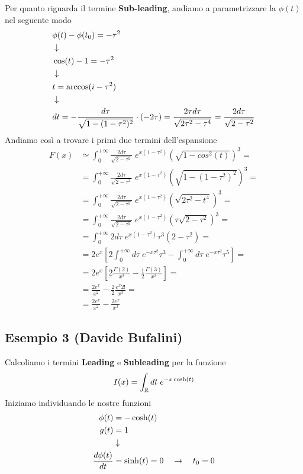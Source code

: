 Per quanto riguarda il termine \textbf{Sub-leading}, andiamo a parametrizzare la $\phi(t)$ nel seguente modo
\begin{align}
	&\phi(t) - \phi(t_0) = -\tau^2 \\ &\downarrow \nonumber \\
	&\cos(t) - 1 = -\tau^2 \nonumber \\ &\downarrow \nonumber \\
	&t= \arccos(i-\tau^2) \\ &\downarrow \nonumber \\
	&dt = -\frac{d\tau}{\sqrt{1-(1-\tau^2)^2}}\cdot(-2\tau) = \frac{2\tau d\tau}{\sqrt{2\tau^2-\tau^4}} = \frac{2d\tau}{\sqrt{2-\tau^2}}
\end{align}
Andiamo così a trovare i primi due termini dell'espansione
\begin{align}
	F(x) &\simeq \int_{0}^{+\infty} \frac{2d\tau}{\sqrt{2-\tau^2}} \; e^{x\left(1- \tau^2\right)}(\sqrt{1-cos^2(t)})^3 = \nonumber\\
	&= \int_{0}^{+\infty} \frac{2d\tau}{\sqrt{2-\tau^2}} \; e^{x\left(1- \tau^2\right)}(\sqrt{1-(1-\tau^2)^2})^3 = \nonumber\\
	&=\int_{0}^{+\infty} \frac{2d\tau}{\sqrt{2-\tau^2}} \; e^{x\left(1- \tau^2\right)}(\sqrt{2\tau^2-t^4})^3 = \nonumber\\
	&=\int_{0}^{+\infty} \frac{2d\tau}{\sqrt{2-\tau^2}} \; e^{x\left(1- \tau^2\right)}(\tau\sqrt{2-\tau^2})^3 = \nonumber\\
	&=\int_{0}^{+\infty} 2d\tau \; e^{x\left(1- \tau^2\right)}\tau^3 (2-\tau^2) = \nonumber\\
	&=2e^x \left[ 2\int_{0}^{+\infty}d\tau \; e^{-x\tau^2} \tau^3 - \int_{0}^{+\infty} d\tau\; e^{-x\tau^2}\tau^5 \right] = \nonumber\\
	&= 2e^x\left[ 2\frac{\Gamma(2)}{x^2} - \frac{1}{2} \frac{\Gamma(3)}{x^3} \right] = \nonumber \\
	&= \frac{2e^x}{x^2} - \frac{2}{2} \frac{e^x 2!}{x^3} =\nonumber\\
	&= \frac{2e^x}{x^2} -\frac{2e^x}{x^3}
\end{align}



\subsection{Esempio 3 (Davide Bufalini)}

Calcoliamo i termini \textbf{Leading} e \textbf{Subleading} per la funzione
\begin{align}
	I(x) = \int_{\mathbb{R}} dt \; e^{-x \cosh(t)}
\end{align}
Iniziamo individuando le  nostre funzioni
\begin{align}
	\phi(t) &= -\cosh(t)\\
	g(t) &= 1 \\ &\downarrow \nonumber \\
	\frac{d\phi(t)}{dt} &= \sinh(t) = 0 \quad \rightarrow \quad t_0 = 0
\end{align}

